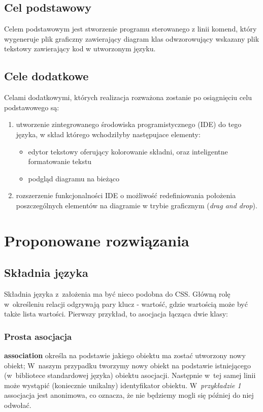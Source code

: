 \documentclass[a4paper,11pt,title]{report}
\begin{document}
\subsection{Cel podstawowy}
Celem podstawowym jest stworzenie programu sterowanego z linii komend, który wygeneruje plik
graficzny zawierający diagram klas odwzorowujący wskazany plik tekstowy zawierający kod w utworzonym
języku.

\subsection{Cele dodatkowe}
Celami dodatkowymi, których realizacja rozważona zostanie po osiągnięciu celu podstawowego są:
\begin{enumerate}
  \item{
    utworzenie zintegrowanego środowiska programistycznego (IDE) do tego języka, w skład którego
    wchodziłyby następujace elementy:
    \begin{itemize}
      \item{edytor tekstowy oferujący kolorowanie składni, oraz inteligentne formatowanie tekstu}
      \item{podgląd diagramu na bieżąco}
    \end{itemize}
  }
  \item{rozszerzenie funkcjonalności IDE o możliwość redefiniowania położenia poszczególnych
    elementów na diagramie w trybie graficznym (\emph{drag and drop}).}
\end{enumerate}
\section{Proponowane rozwiązania}
\subsection{Składnia języka}
Składnia języka z~założenia ma być nieco podobna do CSS. Główną rolę w~określeniu relacji odgrywają
pary klucz - wartość, gdzie wartością może być także lista wartości. Pierwszy przykład, to asocjacja
łącząca dwie klasy:

\subsubsection{Prosta asocjacja}


\textbf{association} określa na podstawie jakiego obiektu ma zostać utworzony nowy obiekt; W~naszym
przypadku tworzymy nowy obiekt na podstawie istniejącego (w~bibliotece standardowej języka) obiektu
asocjacji. Następnie w~tej samej linii może wystąpić (koniecznie unikalny) identyfikator obiektu.
W~\emph{przykładzie 1} assocjacja jest anonimowa, co oznacza, że nie będziemy mogli się później do
niej odwołać.
\end{document}
